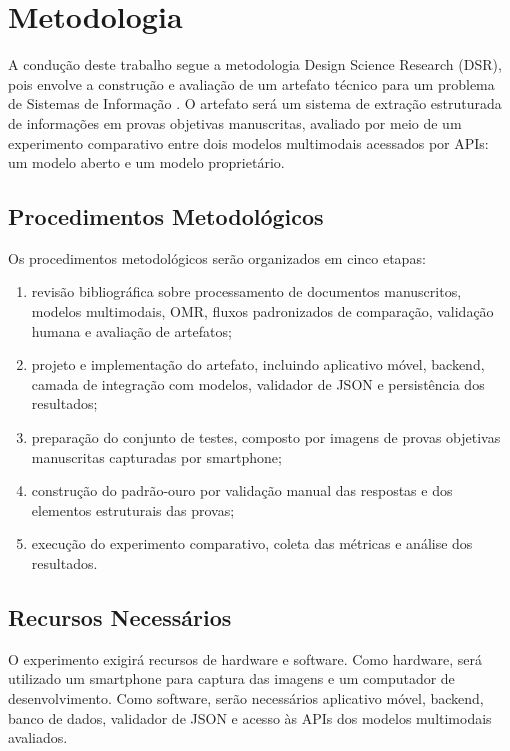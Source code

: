 \chapter{Metodologia}

A condução deste trabalho segue a metodologia Design Science Research (DSR), pois envolve a construção e avaliação de um artefato técnico para um problema de Sistemas de Informação \cite{sposito2024design}. O artefato será um sistema de extração estruturada de informações em provas objetivas manuscritas, avaliado por meio de um experimento comparativo entre dois modelos multimodais acessados por APIs: um modelo aberto e um modelo proprietário.

\section{Procedimentos Metodológicos}

Os procedimentos metodológicos serão organizados em cinco etapas:

\begin{enumerate}
    \item revisão bibliográfica sobre processamento de documentos manuscritos, modelos multimodais, OMR, fluxos padronizados de comparação, validação humana e avaliação de artefatos;
    \item projeto e implementação do artefato, incluindo aplicativo móvel, backend, camada de integração com modelos, validador de JSON e persistência dos resultados;
    \item preparação do conjunto de testes, composto por imagens de provas objetivas manuscritas capturadas por smartphone;
    \item construção do padrão-ouro por validação manual das respostas e dos elementos estruturais das provas;
    \item execução do experimento comparativo, coleta das métricas e análise dos resultados.
\end{enumerate}

\section{Recursos Necessários}

O experimento exigirá recursos de hardware e software. Como hardware, será utilizado um smartphone para captura das imagens e um computador de desenvolvimento. Como software, serão necessários aplicativo móvel, backend, banco de dados, validador de JSON e acesso às APIs dos modelos multimodais avaliados.

